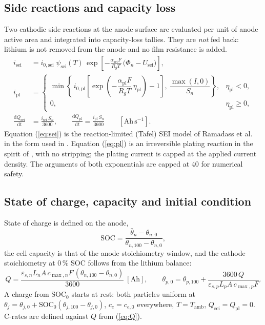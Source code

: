 \documentclass[11pt]{article}
\newcommand{\ce}{c_{e}}
\newcommand{\eps}{\varepsilon}
\newcommand{\dd}{\mathrm{d}}
\newcommand{\Tamb}{T_{\mathrm{amb}}}
\newcommand{\etapl}{\eta_{\mathrm{pl}}}
\begin{document}
\subsection{Side reactions and capacity loss}
Two cathodic side reactions at the anode surface are evaluated per unit of anode active area and integrated into capacity-loss tallies. They are \emph{not} fed back: lithium is not removed from the anode and no film resistance is added.
\begin{align}
i_{\mathrm{sei}}&=i_{0,\mathrm{sei}}\;\psi_{\mathrm{sei}}(T)\,\exp\!\left[-\frac{\alpha_{\mathrm{sei}}F}{R_gT}\,\bigl(\Phi_n-U_{\mathrm{sei}}\bigr)\right], \label{eq:sei}\\
i_{\mathrm{pl}}&=\begin{cases}
\min\!\left\{\,i_{0,\mathrm{pl}}\left[\exp\!\left(-\dfrac{\alpha_{\mathrm{pl}}F}{R_gT}\,\etapl\right)-1\right],\ \dfrac{\max(I,0)}{S_n}\right\}, & \etapl<0,\\[3mm]
0, & \etapl\ge 0,
\end{cases} \label{eq:pl}\\
\frac{\dd Q_{\mathrm{sei}}}{\dd t}&=\frac{i_{\mathrm{sei}}\,S_n}{3600},\qquad \frac{\dd Q_{\mathrm{pl}}}{\dd t}=\frac{i_{\mathrm{pl}}\,S_n}{3600}\qquad[\mathrm{Ah\,s^{-1}}].
\end{align}
Equation (\ref{eq:sei}) is the reaction-limited (Tafel) SEI model of Ramadass et al.~\cite{ramadass2004} in the form used in \cite{okane2022}. Equation (\ref{eq:pl}) is an irreversible plating reaction in the spirit of \cite{arora1999,yang2017}, with no stripping; the plating current is capped at the applied current density. The arguments of both exponentials are capped at 40 for numerical safety.

\subsection{State of charge, capacity and initial condition}
State of charge is defined on the anode,
\begin{equation}
\mathrm{SOC}=\frac{\bar\theta_n-\theta_{n,0}}{\theta_{n,100}-\theta_{n,0}},
\end{equation}
the cell capacity is that of the anode stoichiometry window, and the cathode stoichiometry at 0\,\% SOC follows from the lithium balance:
\begin{equation}
Q=\frac{\eps_{s,n}L_nA\,c_{\max,n}F\,(\theta_{n,100}-\theta_{n,0})}{3600}\ [\mathrm{Ah}],\qquad
\theta_{p,0}=\theta_{p,100}+\frac{3600\,Q}{\eps_{s,p}L_pA\,c_{\max,p}F}. \label{eq:Q}
\end{equation}
A charge from $\mathrm{SOC}_0$ starts at rest: both particles uniform at $\theta_j=\theta_{j,0}+\mathrm{SOC}_0(\theta_{j,100}-\theta_{j,0})$, $\ce=c_{e,0}$ everywhere, $T=\Tamb$, $Q_{\mathrm{sei}}=Q_{\mathrm{pl}}=0$. C-rates are defined against $Q$ from (\ref{eq:Q}).
\end{document}
